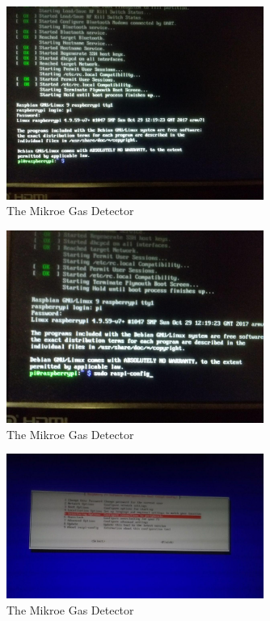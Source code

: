 \documentclass[11pt]{report}
\begin{document}
		\begin{figure}[ht]
			\centering
			\includegraphics[width=0.75\textwidth]{images/pi/first_login_after_login.jpg} 
			\caption{The Mikroe Gas Detector}
		\end{figure}

		\begin{figure}[ht]
			\centering
			\includegraphics[width=0.75\textwidth]{images/pi/ssh_command.jpg} 
			\caption{The Mikroe Gas Detector}
		\end{figure}

		\begin{figure}[ht]
			\centering
			\includegraphics[width=0.75\textwidth]{images/pi/ssh_1.jpg} 
			\caption{The Mikroe Gas Detector}
		\end{figure}
\end{document}
